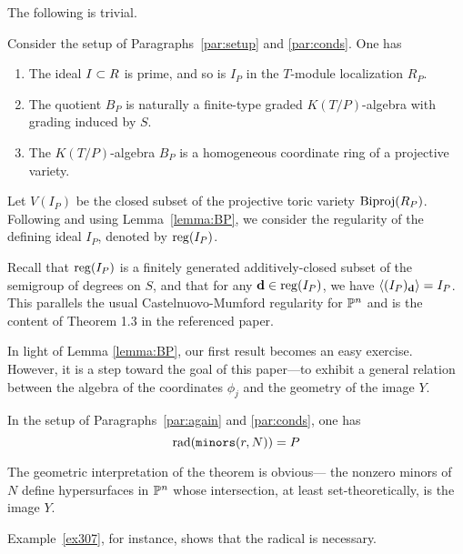 \documentclass[fleqn,reqno]{amsart}
\begin{document}
\begin{paragraf*}
The following is trivial.
\end{paragraf*}

\begin{lemma}
\label{lemma:BP} Consider the setup of Paragraphs~\ref{par:setup} and \ref{par:conds}.
One has
\begin{enumerate}
\item
The ideal $I\subset R$ is prime, and so is $I_P$ in the $T$-module localization $R_P$.

\item
The quotient $B_P$ is naturally a finite-type graded $K(T/P)$-algebra with grading induced by $S$.

\item\label{itm:BPKTP-alg}
The $K(T/P)$-algebra $B_P$ is a homogeneous coordinate ring of a projective variety.
\end{enumerate}
\end{lemma}

\begin{paragraf}
\label{par:reg-IP}
Let $V(I_P)$ be the closed subset of the projective toric variety $\operatorname{Biproj}(R_P)$.
Following \citet{MS-04} and using Lemma~\ref{lemma:BP},
we consider the regularity of the defining ideal $I_P$,
denoted by $\operatorname{reg}(I_P)$.

Recall that $\operatorname{reg}(I_P)$ is a finitely generated additively-closed subset
of the semigroup of degrees on $S$, and that
for any $\mathbf d\in\operatorname{reg}(I_P)$, we have $\langle(I_P)_\mathbf d\rangle=I_P$.
This parallels the usual Castelnuovo-Mumford regularity for $\mathbb{P}^n$
and is the content of Theorem 1.3 in the referenced paper.
\end{paragraf}

\begin{paragraf*}
In light of Lemma \ref{lemma:BP}, our first result becomes an easy exercise.
However, it is a step toward the goal of this paper---to exhibit a general relation between
the algebra of the coordinates $\phi_j$ and the geometry of the image $Y$.
\end{paragraf*}

\begin{theorem}
\label{thm:rad-minors}
In the setup of Paragraphs~\ref{par:again} and \ref{par:conds}, one has
\[
	\operatorname{rad}(\mathop{\tt minors}(r,N))=P
\]
\end{theorem}

\begin{paragraf*}
The geometric interpretation of the theorem is obvious---%
the nonzero minors of $N$ define hypersurfaces in $\mathbb{P}^n$ whose intersection,
at least set-theoretically, is the image $Y$.

Example~\ref{ex307}, for instance, shows that the radical is necessary.
\end{paragraf*}
\end{document}
